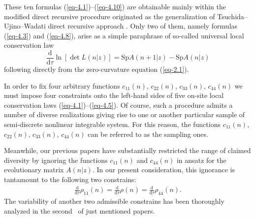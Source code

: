 \documentclass[pdftex]{sigma}
\numberwithin{equation}{section}
\begin{document}
These ten formulas (\ref{eq-4.1})--(\ref{eq-4.10}) are obtainable mainly within the modified direct recursive procedure \cite{vakhnenko-JNMP-18-401, vakhnenko-JNMP-18-415, vakhnenko-JNMP-20-606, vakhnenko-JMP-56-033505} originated as the generalization of Tsuchida--Ujino--Wadati direct recursive approach \cite{tsuchida-JMP-39-4785, tsuchida-JPA-32-2239}. Only two of them, namely formulas (\ref{eq-4.3}) and (\ref{eq-4.8}), arise as a simple paraphrase of so-called universal local conservation law
\begin{equation*}%
	\frac{\mathrm{d}}{\mathrm{d}\tau}\ln\left[\det L(n|z)\right]=\mathrm{Sp} A(n+1|z) -\mathrm{Sp} A(n|z)
\end{equation*}
following directly from the zero-curvature equation (\ref{eq-2.1}).

In order to fix four arbitrary functions $c_{11}(n)$, $c_{22}(n)$, $c_{33}(n)$, $c_{44}(n)$
we must impose four constraints onto the left-hand sides of five on-site local conservation laws (\ref{eq-4.1})--(\ref{eq-4.5}). Of course, such a procedure admits a number of diverse realizations giving rise to one or another particular sample of semi-discrete nonlinear integrable system. For this reason, the functions $c_{11}(n)$, $c_{22}(n)$, $c_{33}(n)$, $c_{44}(n)$ can be referred to as the sampling ones.

Meanwhile, our previous papers \cite{vakhnenko-JNMP-18-401, vakhnenko-JNMP-18-415} have substantially restricted the range of claimed diversity by ignoring the functions $c_{11}(n)$ and $c_{44}(n)$ in ansatz for the evolutionary matrix $A(n|z)$. In our present consideration, this ignorance is tantamount to the following two constrains:
\begin{gather*}%
\frac{\mathrm{d}}{\mathrm{d}\tau}\rho_{11}(n)=\frac{\mathrm{d}}{\mathrm{d}\tau}\rho(n) =\frac{\mathrm{d}}{\mathrm{d}\tau}\rho_{44}(n) .
\end{gather*}
The variability of another two admissible constrains has been thoroughly analyzed in the second~\cite{vakhnenko-JNMP-18-415} of just mentioned papers.
\end{document}
